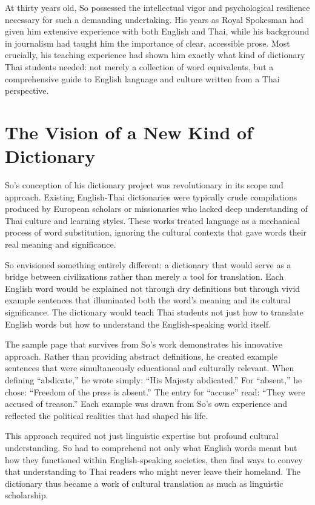 \documentclass[
  Letterpaper,
]{scrbook}
\begin{document}
At thirty years old, So possessed the intellectual vigor and
psychological resilience necessary for such a demanding undertaking. His
years as Royal Spokesman had given him extensive experience with both
English and Thai, while his background in journalism had taught him the
importance of clear, accessible prose. Most crucially, his teaching
experience had shown him exactly what kind of dictionary Thai students
needed: not merely a collection of word equivalents, but a comprehensive
guide to English language and culture written from a Thai perspective.

\section{The Vision of a New Kind of
Dictionary}\label{the-vision-of-a-new-kind-of-dictionary}

So's conception of his dictionary project was revolutionary in its scope
and approach. Existing English-Thai dictionaries were typically crude
compilations produced by European scholars or missionaries who lacked
deep understanding of Thai culture and learning styles. These works
treated language as a mechanical process of word substitution, ignoring
the cultural contexts that gave words their real meaning and
significance.

So envisioned something entirely different: a dictionary that would
serve as a bridge between civilizations rather than merely a tool for
translation. Each English word would be explained not through dry
definitions but through vivid example sentences that illuminated both
the word's meaning and its cultural significance. The dictionary would
teach Thai students not just how to translate English words but how to
understand the English-speaking world itself.

The sample page that survives from So's work demonstrates his innovative
approach. Rather than providing abstract definitions, he created example
sentences that were simultaneously educational and culturally relevant.
When defining ``abdicate,'' he wrote simply: ``His Majesty abdicated.''
For ``absent,'' he chose: ``Freedom of the press is absent.'' The entry
for ``accuse'' read: ``They were accused of treason.'' Each example was
drawn from So's own experience and reflected the political realities
that had shaped his life.

This approach required not just linguistic expertise but profound
cultural understanding. So had to comprehend not only what English words
meant but how they functioned within English-speaking societies, then
find ways to convey that understanding to Thai readers who might never
leave their homeland. The dictionary thus became a work of cultural
translation as much as linguistic scholarship.
\end{document}
